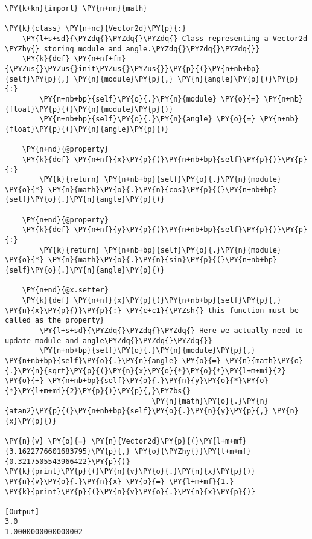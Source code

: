 \begin{Verbatim}[label=\makebox{\url{https://github.com/lucabaldini/cmepda/tree/master/slides/latex/snippets/vector2d\_property\_setter.py}},commandchars=\\\{\}]
\PY{k+kn}{import} \PY{n+nn}{math}

\PY{k}{class} \PY{n+nc}{Vector2d}\PY{p}{:}
    \PY{l+s+sd}{\PYZdq{}\PYZdq{}\PYZdq{} Class representing a Vector2d \PYZhy{} storing module and angle.\PYZdq{}\PYZdq{}\PYZdq{}}   
    \PY{k}{def} \PY{n+nf+fm}{\PYZus{}\PYZus{}init\PYZus{}\PYZus{}}\PY{p}{(}\PY{n+nb+bp}{self}\PY{p}{,} \PY{n}{module}\PY{p}{,} \PY{n}{angle}\PY{p}{)}\PY{p}{:}
        \PY{n+nb+bp}{self}\PY{o}{.}\PY{n}{module} \PY{o}{=} \PY{n+nb}{float}\PY{p}{(}\PY{n}{module}\PY{p}{)}
        \PY{n+nb+bp}{self}\PY{o}{.}\PY{n}{angle} \PY{o}{=} \PY{n+nb}{float}\PY{p}{(}\PY{n}{angle}\PY{p}{)}
   
    \PY{n+nd}{@property}
    \PY{k}{def} \PY{n+nf}{x}\PY{p}{(}\PY{n+nb+bp}{self}\PY{p}{)}\PY{p}{:}
        \PY{k}{return} \PY{n+nb+bp}{self}\PY{o}{.}\PY{n}{module} \PY{o}{*} \PY{n}{math}\PY{o}{.}\PY{n}{cos}\PY{p}{(}\PY{n+nb+bp}{self}\PY{o}{.}\PY{n}{angle}\PY{p}{)}
        
    \PY{n+nd}{@property}
    \PY{k}{def} \PY{n+nf}{y}\PY{p}{(}\PY{n+nb+bp}{self}\PY{p}{)}\PY{p}{:}
        \PY{k}{return} \PY{n+nb+bp}{self}\PY{o}{.}\PY{n}{module} \PY{o}{*} \PY{n}{math}\PY{o}{.}\PY{n}{sin}\PY{p}{(}\PY{n+nb+bp}{self}\PY{o}{.}\PY{n}{angle}\PY{p}{)}
    
    \PY{n+nd}{@x.setter}
    \PY{k}{def} \PY{n+nf}{x}\PY{p}{(}\PY{n+nb+bp}{self}\PY{p}{,} \PY{n}{x}\PY{p}{)}\PY{p}{:} \PY{c+c1}{\PYZsh{} this function must be called as the property}
        \PY{l+s+sd}{\PYZdq{}\PYZdq{}\PYZdq{} Here we actually need to update module and angle\PYZdq{}\PYZdq{}\PYZdq{}}
        \PY{n+nb+bp}{self}\PY{o}{.}\PY{n}{module}\PY{p}{,} \PY{n+nb+bp}{self}\PY{o}{.}\PY{n}{angle} \PY{o}{=} \PY{n}{math}\PY{o}{.}\PY{n}{sqrt}\PY{p}{(}\PY{n}{x}\PY{o}{*}\PY{o}{*}\PY{l+m+mi}{2} \PY{o}{+} \PY{n+nb+bp}{self}\PY{o}{.}\PY{n}{y}\PY{o}{*}\PY{o}{*}\PY{l+m+mi}{2}\PY{p}{)}\PY{p}{,}\PYZbs{}
                                  \PY{n}{math}\PY{o}{.}\PY{n}{atan2}\PY{p}{(}\PY{n+nb+bp}{self}\PY{o}{.}\PY{n}{y}\PY{p}{,} \PY{n}{x}\PY{p}{)}
        
\PY{n}{v} \PY{o}{=} \PY{n}{Vector2d}\PY{p}{(}\PY{l+m+mf}{3.1622776601683795}\PY{p}{,} \PY{o}{\PYZhy{}}\PY{l+m+mf}{0.3217505543966422}\PY{p}{)}
\PY{k}{print}\PY{p}{(}\PY{n}{v}\PY{o}{.}\PY{n}{x}\PY{p}{)}
\PY{n}{v}\PY{o}{.}\PY{n}{x} \PY{o}{=} \PY{l+m+mf}{1.}
\PY{k}{print}\PY{p}{(}\PY{n}{v}\PY{o}{.}\PY{n}{x}\PY{p}{)}

[Output]
3.0
1.0000000000000002
\end{Verbatim}